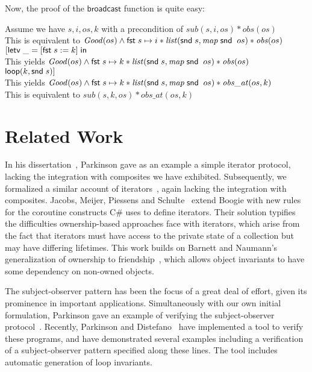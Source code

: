 Now, the proof of the $\mathsf{broadcast}$ function is quite easy: 

\begin{tabbedproof}
\oo Assume we have $s, i, os, k$ with a precondition of $\mathit{sub}(s, i, os) * \mathit{obs}(os)$ \\
\oo This is equivalent to $\mathit{Good}(os) \land \mathsf{fst}\; s\mapsto i * \mathit{list}(\mathsf{snd}\; s, \mathit{map}\;\mathsf{snd}\;\;os) * \mathit{obs}(os)$ \\
\oo $[\mathsf{letv}\;\_ = [\mathsf{fst}\; s := k]\;\mathsf{in}\;$ \\
\oo This yields $\mathit{Good}(os) \land \mathsf{fst}\; s\mapsto k * \mathit{list}(\mathsf{snd}\; s, \mathit{map}\;\mathsf{snd}\;\;os) * \mathit{obs}(os)$ \\
\oo $\mathsf{loop}(k, \mathsf{snd}\; s)]$ \\
\oo This yields $\mathit{Good}(os) \land \mathsf{fst}\; s\mapsto k * \mathit{list}(\mathsf{snd}\; s, \mathit{map}\;\mathsf{snd}\;\;os) * \mathit{obs\_at}(os, k)$ \\
\oo This is equivalent to $\mathit{sub}(s, k, os) * \mathit{obs\_at}(os,k)$ 
\end{tabbedproof}

% 

\section{Related Work}

In his dissertation~\cite{parkinson-thesis}, Parkinson gave as an
example a simple iterator protocol, lacking the integration with
composites we have exhibited.  Subsequently, we formalized a similar
account of iterators~\cite{iterator}, again lacking the integration
with composites. Jacobs, Meijer, Piessens and
Schulte~\cite{iterators-revisited} extend Boogie with new rules for
the coroutine constructs C\# uses to define iterators. Their solution
typifies the difficulties ownership-based approaches face with
iterators, which arise from the fact that iterators must have access
to the private state of a collection but may have differing
lifetimes. This work builds on Barnett and Naumann's generalization of
ownership to friendship~\cite{friends}, which allows object invariants
to have some dependency on non-owned objects.

The subject-observer pattern has been the focus of a great deal of effort,
given its prominence in important applications. Simultaneously with our own
initial formulation, Parkinson gave an example of verifying the
subject-observer protocol~\cite{parkinson-iwaco-07}. Recently, Parkinson and
Distefano~\cite{jstar-parkinson-distefano} have implemented a tool to verify
these programs, and have demonstrated several examples including a verification
of a subject-observer pattern specified along these lines. The tool includes
automatic generation of loop invariants. 

